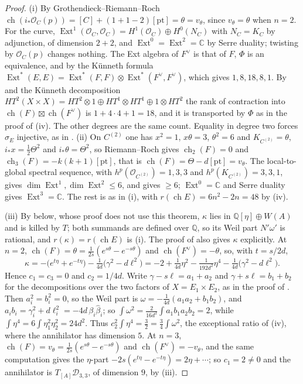 \documentclass[11pt,reqno]{amsart}
\theoremstyle{plain}
\theoremstyle{definition}
\theoremstyle{remark}
\newcommand{\QQ}{\mathbb{Q}}
\newcommand{\CC}{\mathbb{C}}
\newcommand{\cO}{\mathcal{O}}
\newcommand{\cD}{\mathcal{D}}
\newcommand{\HW}{W}                      %
\DeclareMathOperator{\ch}{ch}
\DeclareMathOperator{\Ext}{Ext}
\begin{document}
\begin{proof}
(i) By Grothendieck--Riemann--Roch $\ch(i_{*}\cO_{C}(p))=[C]+(1+1-2)[\mathrm{pt}]
=\theta=v_{\theta}$, since $v_{\theta}=\theta$ when $n=2$. For the curve,
$\Ext^{1}(\cO_{C},\cO_{C})=H^{1}(\cO_{C})\oplus H^{0}(N_{C})$ with
$N_{C}=K_{C}$ by adjunction, of dimension $2+2$, and $\Ext^{0}=\Ext^{2}=\CC$ by
Serre duality; twisting by $\cO_{C}(p)$ changes nothing. The Ext algebra of
$F^{\vee}$ is that of $F$, $\Phi$ is an equivalence, and by the K\"unneth
formula $\Ext^{*}(E,E)=\Ext^{*}(F,F)\otimes\Ext^{*}(F^{\vee},F^{\vee})$, which
gives $1,8,18,8,1$. By  and the K\"unneth
decomposition $HT^{2}(X\times X)=HT^{2}\otimes1\oplus HT^{1}\otimes HT^{1}\oplus
1\otimes HT^{2}$ the rank of contraction into $\ch(F)\boxtimes\ch(F^{\vee})$ is
$1+4\cdot4+1=18$, and it is transported by $\Phi$ as in the proof of
(iv). The other degrees are the same count. Equality in
degree two forces $\sigma_{E}$ injective, as in .
(ii) On $C^{(2)}$ one has $x^{2}=1$, $x\theta=3$, $\theta^{2}=6$ and
$K_{C^{(2)}}=\theta$, $i_{*}x=\frac12\Theta^{2}$ and $i_{*}\theta=\Theta^{2}$, so
Riemann--Roch gives $\ch_{2}(F)=0$ and $\ch_{3}(F)=-k(k+1)[\mathrm{pt}]$, that
is $\ch(F)=\Theta-d[\mathrm{pt}]=v_{\theta}$. The local-to-global spectral
sequence, with $h^{p}(\cO_{C^{(2)}})=1,3,3$ and $h^{p}(K_{C^{(2)}})=3,3,1$,
gives $\dim\Ext^{1},\dim\Ext^{2}\le6$, and  gives
$\ge6$; $\Ext^{0}=\CC$ and Serre duality gives $\Ext^{3}=\CC$. The rest is as
in (i), with $r(\ch E)=6n^{2}-2n=48$ by (iv).

(iii) By  below, whose proof does not use this theorem,
$\kappa$ lies in $\QQ[\eta]\oplus\HW(A)$ and is killed by $T$; both summands
are defined over $\QQ$, so its Weil part $N'\omega'$ is rational, and
$r(\kappa)=r(\ch E)$ is (i). The proof of
 also gives $\kappa$ explicitly. At $n=2$,
$\ch(F)=\theta=\frac{1}{2s}(e^{s\theta}-e^{-s\theta})$ and
$\ch(F^{\vee})=-\theta$, so, with $t=s/2d$,
\[
  \kappa=-\bigl(e^{t\eta}+e^{-t\eta}\bigr)-\tfrac{1}{4d}\bigl(\gamma^{2}-d\ell^{2}\bigr)
  =-2+\tfrac{1}{4d}\eta^{2}-\tfrac{1}{192d^{2}}\eta^{4}
   -\tfrac{1}{4d}\bigl(\gamma^{2}-d\ell^{2}\bigr).
\]
Hence $c_{1}=c_{3}=0$ and $c_{2}=1/4d$. Write $\gamma-s\ell=a_{1}+a_{2}$ and
$\gamma+s\ell=b_{1}+b_{2}$ for the decompositions over the two factors of
$X=E_{1}\times E_{2}$, as in the proof of . Then
$a_{i}^{2}=b_{i}^{2}=0$, so the Weil part is
$\omega=-\frac{1}{4d}(a_{1}a_{2}+b_{1}b_{2})$, and
$a_{i}b_{i}=\gamma_{i}^{2}+d\ell_{i}^{2}=-4d\,\beta_{i}\widehat\beta_{i}$; so
$\int\omega^{2}=\frac{2}{16d^{2}}\int a_{1}b_{1}a_{2}b_{2}=2$, while
$\int\eta^{4}=6\int\eta_{1}^{2}\eta_{2}^{2}=24d^{2}$. Thus
$c_{2}^{2}\int\eta^{4}=\frac32=\frac34\int\omega^{2}$, the exceptional ratio of
(iv), where the annihilator has dimension $5$. At
$n=3$, $\ch(F)=v_{\theta}=\frac{1}{2s}(e^{s\theta}-e^{-s\theta})$ and
$\ch(F^{\vee})=-v_{\theta}$, and the same computation gives the
$\eta$-part $-2s(e^{t\eta}-e^{-t\eta})=2\eta+\cdots$; so $c_{1}=2\ne0$ and the
annihilator is $T_{[A]}\cD_{3,3}$, of dimension $9$, by
(iii).


\end{proof}
\end{document}
